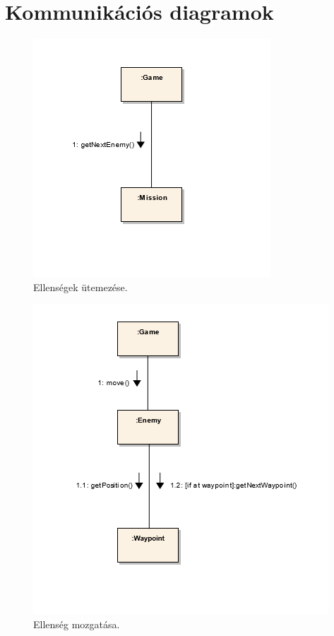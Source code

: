 \section{Kommunikációs diagramok}

\begin{figure}[H]
\begin{center}
\includegraphics{images/ch05/nextEnemyKomm.png}
\caption{Ellenségek ütemezése.}
\label{fig:nextEnemyKomm}
\end{center}
\end{figure}

\begin{figure}[H]
\begin{center}
\includegraphics{images/ch05/moveKomm.png}
\caption{Ellenség mozgatása.}
\label{fig:moveKomm}
\end{center}
\end{figure}

